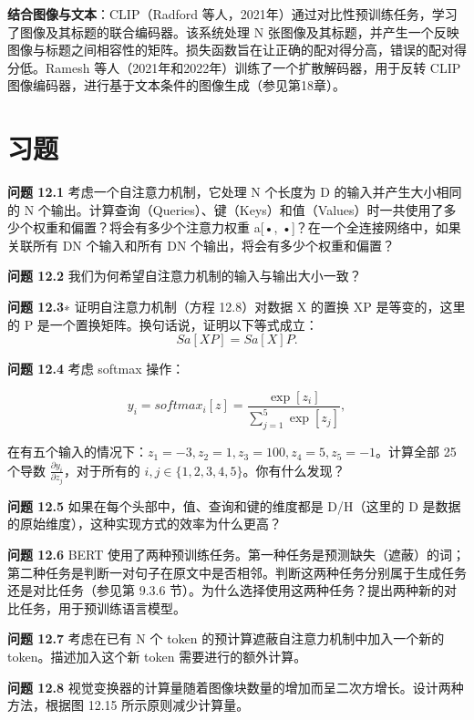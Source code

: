 \textbf{结合图像与文本}：CLIP（Radford 等人，2021年）通过对比性预训练任务，学习了图像及其标题的联合编码器。该系统处理 N 张图像及其标题，并产生一个反映图像与标题之间相容性的矩阵。损失函数旨在让正确的配对得分高，错误的配对得分低。Ramesh 等人（2021年和2022年）训练了一个扩散解码器，用于反转 CLIP 图像编码器，进行基于文本条件的图像生成（参见第18章）。


\section{习题}
\textbf{问题 12.1} 考虑一个自注意力机制，它处理 N 个长度为 D 的输入并产生大小相同的 N 个输出。计算查询（Queries）、键（Keys）和值（Values）时一共使用了多少个权重和偏置？将会有多少个注意力权重 a[•, •]？在一个全连接网络中，如果关联所有 DN 个输入和所有 DN 个输出，将会有多少个权重和偏置？

\textbf{问题 12.2} 我们为何希望自注意力机制的输入与输出大小一致？

\textbf{问题 12.3}∗ 证明自注意力机制（方程 12.8）对数据 X 的置换 XP 是等变的，这里的 P 是一个置换矩阵。换句话说，证明以下等式成立：
\begin{equation}
Sa[XP] = Sa[X]P. 
\end{equation}

\textbf{问题 12.4} 考虑 softmax 操作：

\begin{equation}
y_i = softmax_i[z] = \frac{\exp[z_i]}{\sum_{j=1}^{5} \exp[z_j]}, 
\end{equation}

在有五个输入的情况下：\(z_1 = -3, z_2 = 1, z_3 = 100, z_4 = 5, z_5 = -1\)。计算全部 25 个导数 \(\frac{\partial y_i}{\partial z_j}\)，对于所有的 \(i,j \in \{1,2,3,4,5\}\)。你有什么发现？

\textbf{问题 12.5} 如果在每个头部中，值、查询和键的维度都是 D/H（这里的 D 是数据的原始维度），这种实现方式的效率为什么更高？

\textbf{问题 12.6} BERT 使用了两种预训练任务。第一种任务是预测缺失（遮蔽）的词；第二种任务是判断一对句子在原文中是否相邻。判断这两种任务分别属于生成任务还是对比任务（参见第 9.3.6 节）。为什么选择使用这两种任务？提出两种新的对比任务，用于预训练语言模型。

\textbf{问题 12.7} 考虑在已有 N 个 token 的预计算遮蔽自注意力机制中加入一个新的 token。描述加入这个新 token 需要进行的额外计算。

\textbf{问题 12.8} 视觉变换器的计算量随着图像块数量的增加而呈二次方增长。设计两种方法，根据图 12.15 所示原则减少计算量。

